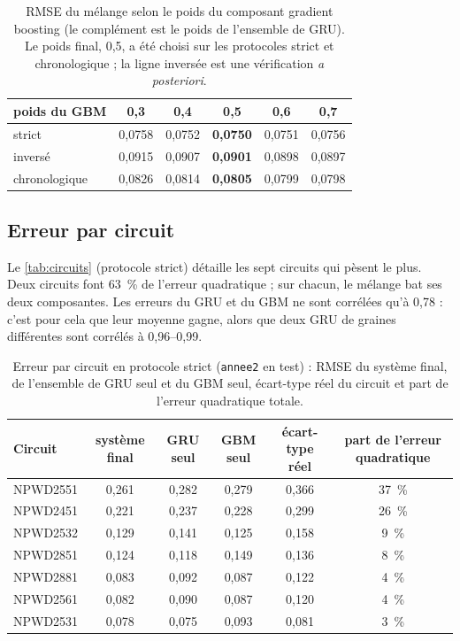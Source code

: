 \documentclass[11pt,a4paper]{article}
\begin{document}
\begin{table}[htbp]
\centering\small
\caption{RMSE du mélange selon le poids du composant gradient boosting (le complément est le poids de l'ensemble de GRU). Le poids final, 0,5, a été choisi sur les protocoles strict et chronologique ; la ligne inversée est une vérification \emph{a posteriori}.}
\label{tab:poids}
\begin{tabular}{l c c c c c}
\toprule
poids du GBM & 0,3 & 0,4 & \textbf{0,5} & 0,6 & 0,7 \\
\midrule
strict & 0,0758 & 0,0752 & \textbf{0,0750} & 0,0751 & 0,0756 \\
inversé & 0,0915 & 0,0907 & \textbf{0,0901} & 0,0898 & 0,0897 \\
chronologique & 0,0826 & 0,0814 & \textbf{0,0805} & 0,0799 & 0,0798 \\
\bottomrule
\end{tabular}
\end{table}

\subsection{Erreur par circuit}\label{sec:circuits}

Le \autoref{tab:circuits} (protocole strict) détaille les sept circuits qui pèsent le plus. Deux circuits font 63~\% de l'erreur quadratique ; sur chacun, le mélange bat ses deux composantes. Les erreurs du GRU et du GBM ne sont corrélées qu'à 0,78 : c'est pour cela que leur moyenne gagne, alors que deux GRU de graines différentes sont corrélés à 0,96--0,99.

\begin{table}[htbp]
\centering\small
\caption{Erreur par circuit en protocole strict (\texttt{annee2} en test) : RMSE du système final, de l'ensemble de GRU seul et du GBM seul, écart-type réel du circuit et part de l'erreur quadratique totale.}
\label{tab:circuits}
\begin{tabular}{l c c c c c}
\toprule
Circuit & système final & GRU seul & GBM seul & écart-type réel & part de l'erreur quadratique \\
\midrule
NPWD2551 & 0,261 & 0,282 & 0,279 & 0,366 & 37~\% \\
NPWD2451 & 0,221 & 0,237 & 0,228 & 0,299 & 26~\% \\
NPWD2532 & 0,129 & 0,141 & 0,125 & 0,158 & 9~\% \\
NPWD2851 & 0,124 & 0,118 & 0,149 & 0,136 & 8~\% \\
NPWD2881 & 0,083 & 0,092 & 0,087 & 0,122 & 4~\% \\
NPWD2561 & 0,082 & 0,090 & 0,087 & 0,120 & 4~\% \\
NPWD2531 & 0,078 & 0,075 & 0,093 & 0,081 & 3~\% \\
\bottomrule
\end{tabular}
\end{table}
\end{document}
